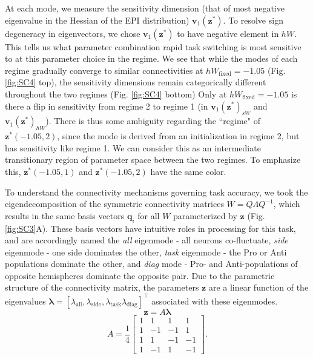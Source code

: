 \documentclass[11pt]{article}
\begin{document}
At each mode, we measure the sensitivity dimension (that of most negative eigenvalue in the Hessian of the EPI distribution) $\mathbf{v}_1(\mathbf{z}^*)$.
To resolve sign degeneracy in eigenvectors, we chose $\mathbf{v}_1(\mathbf{z}^*)$ to have negative element in $hW$.
This tells us what parameter combination rapid task switching is most sensitive to at this parameter choice in the regime.
We see that while the modes of each regime gradually converge to similar connectivities at $hW_{\text{fixed}} = -1.05$ (Fig. \ref{fig:SC4} top), the sensitivity dimensions remain categorically different throughout the two regimes (Fig. \ref{fig:SC4} bottom)
Only at $hW_{\text{fixed}} = -1.05$ is there a flip in sensitivity from regime 2 to regime 1 (in $\mathbf{v}_1(\mathbf{z}^*)_{sW}$ and $\mathbf{v}_1(\mathbf{z}^*)_{hW}$).
There is thus some ambiguity regarding the ``regime" of $\mathbf{z}^*(-1.05, 2)$, since the mode is derived from an initialization in regime 2, but has sensitivity like regime 1.
We can consider this as an intermediate transitionary region of parameter space between the two regimes.
To emphasize this, $\mathbf{z}^*(-1.05, 1)$ and $\mathbf{z}^*(-1.05, 2)$ have the same color.

To understand the connectivity mechanisms governing task accuracy, we took the eigendecomposition of the symmetric connectivity matrices $W = Q\Lambda Q^{-1}$, which results in the same basis vectors $\mathbf{q}_i$ for all $W$ parameterized by $\mathbf{z}$ (Fig. \ref{fig:SC3}A). 
These basis vectors have intuitive roles in processing for this task, and are accordingly named the \textit{all} eigenmode - all neurons co-fluctuate, \textit{side} eigenmode - one side dominates the other, \textit{task} eigenmode - the Pro or Anti populations dominate the other, and \textit{diag} mode - Pro- and Anti-populations of opposite hemispheres dominate the opposite pair. 
Due to the parametric structure of the connectivity matrix, the parameters $\mathbf{z}$ are a linear function of the eigenvalues $\bm{\lambda} = [\lambda_{\text{all}}, \lambda_{\text{side}}, \lambda_{\text{task}}\lambda_{\text{diag}}]^\top$ associated with these eigenmodes.
\begin{equation}
\mathbf{z} = A\bm{\lambda}
\end{equation}
\begin{equation}
A = \frac{1}{4} \begin{bmatrix} 1 & 1 & 1 & 1 \\ 1 & -1 & -1 & 1 \\ 1 & 1 & -1 & -1 \\ 1 & -1 & 1 & -1 \end{bmatrix}.
\end{equation}
\end{document}
